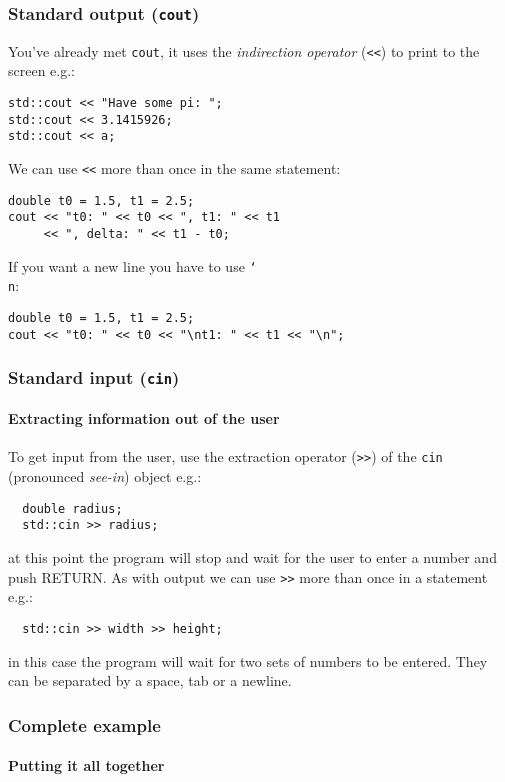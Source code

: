 \documentclass{beamer}
\begin{document}
\begin{frame}[fragile]
  \frametitle{Standard output (\texttt{cout})}
  
  You've already met \texttt{cout}, it uses the \textit{indirection operator} (\texttt{<<}) to print to the screen e.g.:
  \begin{lstlisting}
std::cout << "Have some pi: ";
std::cout << 3.1415926;
std::cout << a;
  \end{lstlisting}
  \pause
  We can use \texttt{<<} more than once in the same statement:
  \begin{lstlisting}
double t0 = 1.5, t1 = 2.5;
cout << "t0: " << t0 << ", t1: " << t1
     << ", delta: " << t1 - t0;
  \end{lstlisting}
	\pause
  If you want a new line you have to use \texttt{\char`\\ n}:
  \begin{lstlisting}
double t0 = 1.5, t1 = 2.5;
cout << "t0: " << t0 << "\nt1: " << t1 << "\n";
  \end{lstlisting}
\end{frame}

\begin{frame}[fragile]
  \frametitle{Standard input (\texttt{cin})}
  \framesubtitle{Extracting information out of the user}
  To get input from the user, use the extraction operator (\texttt{>>}) of the \texttt{cin} (pronounced \textit{see-in}) object e.g.:
  \begin{lstlisting}
  double radius;
  std::cin >> radius;
  \end{lstlisting}
  at this point the program will stop and wait for the user to enter a number and push RETURN.
  \pause
  As with output we can use \texttt{>>} more than once in a statement e.g.:
  \begin{lstlisting}
  std::cin >> width >> height;
  \end{lstlisting}
  in this case the program will wait for two sets of numbers to be entered.  They can be separated by a space, tab or a newline.
\end{frame}

\begin{frame}[fragile]
  \frametitle{Complete example}
  \framesubtitle{Putting it all together}
  
\end{frame}
\end{document}
